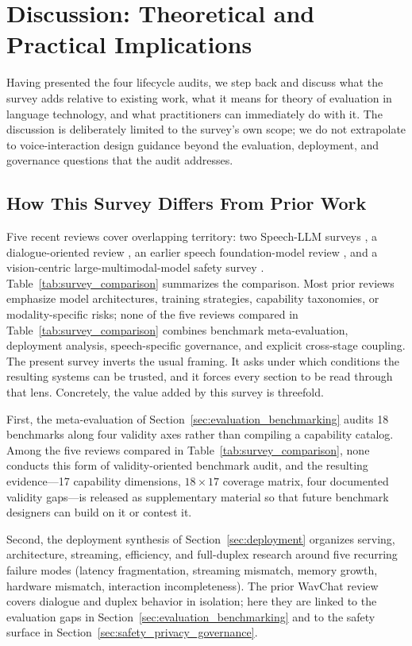 \section{Discussion: Theoretical and Practical Implications}
\label{sec:discussion}

Having presented the four lifecycle audits, we step back and discuss
what the survey adds relative to existing work, what it means for
theory of evaluation in language technology, and what practitioners
can immediately do with it. The discussion is deliberately limited to
the survey's own scope; we do not extrapolate to voice-interaction
design guidance beyond the evaluation, deployment, and governance
questions that the audit addresses.

\subsection{How This Survey Differs From Prior Work}
\label{subsec:discussion_differentiation}

Five recent reviews cover overlapping territory: two Speech-LLM
surveys \citep{cui2024recent,peng2025surveyspeechlargelanguage}, a
dialogue-oriented review \citep{ji2024wavchat}, an earlier speech
foundation-model review \citep{latif2023sparks}, and a
vision-centric large-multimodal-model safety survey
\citep{ye2024survey}. Table~\ref{tab:survey_comparison} summarizes the
comparison. Most prior reviews emphasize model architectures,
training strategies, capability taxonomies, or modality-specific
risks; none of the five reviews compared in
Table~\ref{tab:survey_comparison} combines benchmark meta-evaluation,
deployment analysis, speech-specific governance, and explicit
cross-stage coupling. The present survey inverts the usual framing.
It asks under which conditions the resulting systems can be trusted,
and it forces every section to be read through that lens.
Concretely, the value added by this survey is threefold.

First, the meta-evaluation of Section~\ref{sec:evaluation_benchmarking}
audits 18 benchmarks along four validity axes rather than compiling a
capability catalog. Among the five reviews compared in
Table~\ref{tab:survey_comparison}, none conducts this form of
validity-oriented benchmark audit, and the resulting
evidence---17 capability dimensions,
$18\times 17$ coverage matrix, four documented validity gaps---is
released as supplementary material so that future benchmark designers
can build on it or contest it.

Second, the deployment synthesis of Section~\ref{sec:deployment}
organizes serving, architecture, streaming, efficiency, and full-duplex
research around five recurring failure modes (latency fragmentation,
streaming mismatch, memory growth, hardware mismatch, interaction
incompleteness). The prior WavChat review \citep{ji2024wavchat} covers
dialogue and duplex behavior in isolation; here they are linked to the
evaluation gaps in Section~\ref{sec:evaluation_benchmarking} and to the
safety surface in Section~\ref{sec:safety_privacy_governance}.

